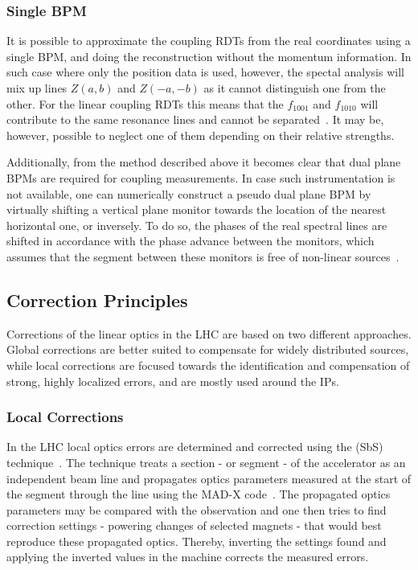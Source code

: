 \subsubsection*{Single BPM}

It is possible to approximate the coupling \glspl{RDT} from the real coordinates using a single \gls{BPM}, and doing the reconstruction without the momentum information.
In such case where only the position data is used, however, the spectal analysis will mix up lines \(Z(a,b)\) and \(Z(-a, -b)\) as it cannot distinguish one from the other.
For the linear coupling RDTs this means that the \(f_{1001}\) and \(f_{1010}\) will contribute to the same resonance lines and cannot be separated~\cite{PHD:Persson}.
It may be, however, possible to neglect one of them depending on their relative strengths.

Additionally, from the method described above it becomes clear that dual plane BPMs are required for coupling measurements.
In case such instrumentation is not available, one can numerically construct a pseudo dual plane BPM by virtually shifting a vertical plane monitor towards the location of the nearest horizontal one, or inversely.
To do so, the phases of the real spectral lines are shifted in accordance with the phase advance between the monitors, which assumes that the segment between these monitors is free of non-linear sources~\cite{PHD:Vanbavinckhove}.

\subsection{Correction Principles}
\label{subsection:correction_principles}

Corrections of the linear optics in the LHC are based on two different approaches.
Global corrections are better suited to compensate for widely distributed sources, while local corrections are focused towards the identification and compensation of strong, highly localized errors, and are mostly used around the IPs.

\subsubsection*{Local Corrections}

In the LHC local optics errors are determined and corrected using the  (SbS) technique~\cite{PRAB:Tomas:CERN_LHC_OMC,PRAB:Tomas:Review_Linear_Optics_Measurements}.
The technique treats a section - or segment - of the accelerator as an independent beam line and propagates optics parameters measured at the start of the segment through the line using the MAD-X code~\cite{CODE:MADX_guide}.
The propagated optics parameters may be compared with the observation and one then tries to find correction settings - powering changes of selected magnets - that would best reproduce these propagated optics.
Thereby, inverting the settings found and applying the inverted values in the machine corrects the measured errors.

